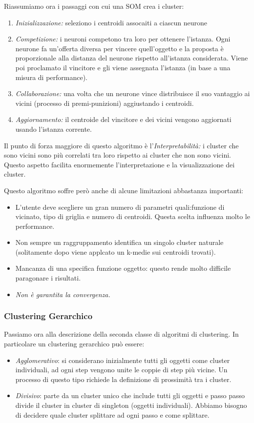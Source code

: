 Riassumiamo ora i passaggi 	con cui una SOM crea i cluster:
\begin{enumerate}
	\item \textit{Inizializzazione:} seleziono i centroidi assocaiti a ciascun neurone
	\item \textit{Competizione:} i neuroni competono tra loro per ottenere l'istanza. Ogni neurone fa un'offerta diversa per vincere quell'oggetto e la proposta è proporzionale alla distanza del neurone rispetto all'istanza considerata. Viene poi proclamato il vincitore e gli viene assegnata l'istanza (in base a una misura di performance).
	\item \textit{Collaborazione:} una volta che un neurone vince distribuisce il suo vantaggio ai vicini (processo di premi-punizioni) aggiustando i centroidi.
	\item \textit{Aggiornamento:} il centroide del vincitore e dei vicini vengono aggiornati usando l'istanza corrente.
\end{enumerate} 

Il punto di forza maggiore di questo algoritmo è l'\textit{Interpretabilità:} i cluster che sono vicini sono più correlati tra loro rispetto ai cluster che non sono vicini. Questo aspetto facilita enormemente l'interpretazione e la visualizzazione dei cluster.

Questo algoritmo soffre però anche di alcune limitazioni abbastanza importanti:
\begin{itemize}
	\item L'utente deve  scegliere un gran numero di parametri quali:funzione di vicinato, tipo di griglia e numero di centroidi. Questa scelta influenza molto le performance.
	\item Non sempre un raggruppamento identifica un singolo cluster naturale (solitamente dopo viene applcato un k-medie sui centroidi trovati).
	\item Mancanza di una specifica funzione oggetto: questo rende molto difficile paragonare i risultati.
	\item \textit{Non è garantita la convergenza.}
\end{itemize}

\subsubsection{Clustering Gerarchico}
Passiamo ora alla descrizione della seconda classe di algoritmi di clustering.
In particolare un clustering gerarchico può essere:
\begin{itemize}
	\item \textit{Agglomerativo}: si considerano inizialmente tutti gli oggetti come cluster individuali, ad ogni step vengono unite le coppie di step più vicine. Un processo di questo tipo richiede la definizione di prossimità tra i cluster.
	 
	\item \textit{Divisivo}: parte da un cluster unico che include tutti gli oggetti e passo passo divide il cluster in cluster di singleton (oggetti individuali). Abbiamo bisogno di decidere quale cluster splittare ad ogni passo e come splittare.
\end{itemize}

